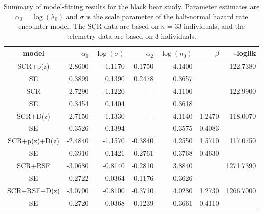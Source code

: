 \begin{table}
\centering
\caption{
Summary of model-fitting results for the black bear study. Parameter
estimates are $\alpha_{0} = \log(\lambda_{0})$ and $\sigma$ is the
scale parameter of the half-normal hazard rate encounter model.
The SCR data are based on $n=33$ individuals, and the telemetry data
are based on 3 individuals.
}
\begin{tabular}{c|rrrrrr}
\hline \hline
model & $\alpha_0$ & $\log(\sigma)$ & $\alpha_{2}$ & $\log(n_{0})$ &
$\beta$ & -loglik \\ \hline
SCR+p(z)     & -2.8600  & -1.1170  &  0.1750 &  4.1400   &        &122.7380  \\
   SE        &  0.3899 &  0.1390 &  0.2478&  0.3657  &        & \\
 SCR         & -2.7290  &  -1.1220 &  ---&  4.1100   &        &              122.9900   \\
   SE        &  0.3454 &   0.1404&        &  0.3618  &        &       \\
SCR+D(z)     & -2.7150  & -1.1330  &  ---  &  4.1140   & 1.2470  &   118.0070  \\
   SE        &  0.3526 & 0.1394  &        &  0.3575  & 0.4083 &       \\
SCR+p(z)+D(z)& -2.4840  & -1.1570  &-0.3840  &  4.2550   & 1.5710  &      117.0750 \\
   SE        &  0.3910 &  0.1421 & 0.2761 &  0.3768  & 0.4630 & \\
SCR+RSF     &   -3.0680  & -0.8140  &-0.2810  &  3.8840   &        &   1271.7390 \\
   SE       &    0.2722 &  0.0364 & 0.1176 &  0.3626  &        & \\
SCR+RSF+D(z)&  -3.0700  &-0.8100   &-0.3710  &  4.0280   & 1.2730  &   1266.7000 \\
   SE       &   0.2720 &  0.0368  & 0.1239 &  0.3661  & 0.4110 &    \\
\hline
\end{tabular}
\label{tab.nyresults}
\end{table}





